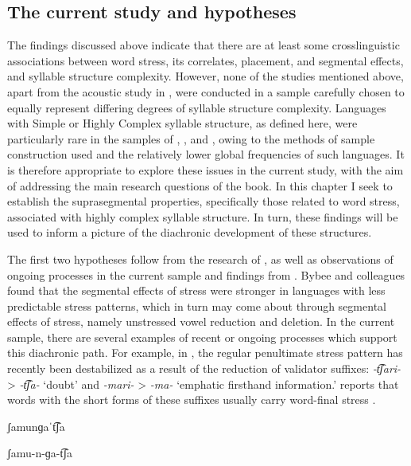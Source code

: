\subsection{The current study and hypotheses}\label{sec:5.1.3}

  The findings discussed above indicate that there are at least some crosslinguistic associations between word stress, its correlates, placement, and segmental effects, and syllable structure complexity. However, none of the studies mentioned above, apart from the acoustic study in \citet{EasterdayEtAl2011}, were conducted in a sample carefully chosen to equally represent differing degrees of syllable structure complexity. Languages with Simple or Highly Complex syllable structure, as defined here, were particularly rare in the samples of \citet{Auer1993}, \citet{BybeeEtAl1998}, and \citet{Schiering2007}, owing to the methods of sample construction used and the relatively lower global frequencies of such languages. It is therefore appropriate to explore these issues in the current study, with the aim of addressing the main research questions of the book. In this chapter I seek to establish the suprasegmental properties, specifically those related to word stress, associated with highly complex syllable structure. In turn, these findings will be used to inform a picture of the diachronic development of these structures.

  The first two hypotheses follow from the research of \citet{BybeeEtAl1998}, as well as observations of ongoing processes in the current sample and findings from . Bybee and colleagues found that the segmental effects of stress were stronger in languages with less predictable stress patterns, which in turn may come about through segmental effects of stress, namely unstressed vowel reduction and deletion. In the current sample, there are several examples of recent or ongoing processes which support this diachronic path. For example, in , the regular penultimate stress pattern has recently been destabilized as a result of the reduction of validator suffixes: \textit{-t͡ʃari-} > \textit{-t͡ʃa-} ‘doubt’ and \textit{-mari-} > \textit{-ma-} ‘emphatic firsthand information.’ \citet{Cole1982} reports that words with the short forms of these suffixes usually carry word-final stress .

\ea\label{ex:5.1}

ʃamunɡaˈt͡ʃa

ʃamu-n-ɡa-t͡ʃa

